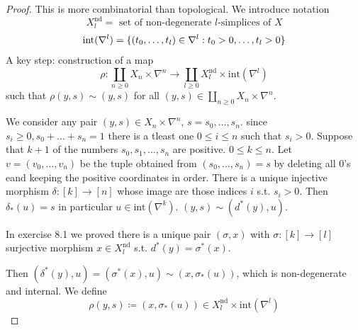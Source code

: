 \documentclass[language=english]{TemplateLecture}
\begin{document}
\begin{proof}
    This is more combinatorial than topological. We introduce notation
    \[X^{\text{nd}}_l =\text{ set of non-degenerate } l\text{-simplices of } X\]
    \[\mathrm{int}(\nabla^l) = \{(t_0, \dots, t_l)\in \nabla^l: t_0 > 0, \dots, t_l > 0\}\]
    A key step: construction of a map
    \[\rho\colon \coprod_{n\geq 0} X_n \times \nabla^n \to \coprod_{l\geq 0} X^{\text{nd}}_l \times \mathrm{int}(\nabla^l)\]
    such that \(\rho(y,s) \sim (y,s)\) for all \((y,s)\in \coprod_{n\geq 0} X_n\times \nabla^n\).

    We consider any pair \((y,s) \in X_n \times \nabla^n\), \(s = s_0, \dots, s_n\). since \(s_i\geq 0, s_0+ \dots + s_n = 1\) there is a tleast one \(0 \leq i\leq n\) such that \(s_i > 0\). Suppose that \(k+1\) of the numbers \(s_0, s_1, \dots, s_n\) are positive. \(0 \leq k \leq n\). Let \(v = (v_0, \dots, v_n)\) be the tuple obtained from \((s_0, \dots, s_n) = s\) by deleting all 0's eand keeping the positive coordinates in order. There is a unique injective morphism \(\delta\colon [k]\to [n]\) whose image are those indices \(i\) s.t. \(s_i > 0\).
    Then \(\delta_*(u) = s\) in particular \(u \in \mathrm{int}(\nabla^k)\). \((y,s)\sim (d^*(y), u)\).

    In exercise 8.1 we proved there is a unique pair \((\sigma, x)\) with \(\sigma\colon [k]\to [l]\) surjective morphism \(x\in X_l^{\text{nd}}\) s.t. \(d^*(y) = \sigma^*(x)\).

    Then \((\delta^*(y), u) = (\sigma^*(x),u) \sim (x, \sigma_*(u))\), which is non-degenerate and internal. We define
    \[\rho(y,s)\coloneq (x, \sigma_*(u))\in X_l^{\text{nd}}\times \mathrm{int}(\nabla^l)\]


\end{proof}
\end{document}
